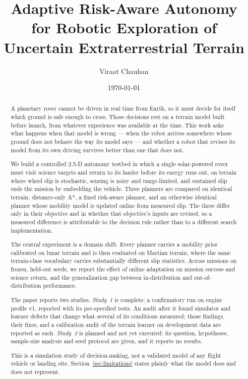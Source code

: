 \documentclass[11pt]{article}
\title{\textbf{Adaptive Risk-Aware Autonomy for Robotic Exploration of\\
Uncertain Extraterrestrial Terrain}}
\author{Viraat Chauhan}
\date{\today}
\begin{document}
\maketitle

\begin{abstract}
\noindent
A planetary rover cannot be driven in real time from Earth, so it must decide
for itself which ground is safe enough to cross. Those decisions rest on a
terrain model built before launch, from whatever experience was available at
the time. This work asks what happens when that model is wrong --- when the
robot arrives somewhere whose ground does not behave the way its model says
--- and whether a robot that revises its model from its own driving survives
better than one that does not.

We build a controlled 2.5-D autonomy testbed in which a single solar-powered
rover must visit science targets and return to its lander before its energy
runs out, on terrain where wheel slip is stochastic, sensing is noisy and
range-limited, and sustained slip ends the mission by embedding the vehicle.
Three planners are compared on identical terrain: distance-only \mbox{A*}, a
fixed risk-aware planner, and an otherwise identical planner whose mobility
model is updated online from measured slip. The three differ only in their
objective and in whether that objective's inputs are revised, so a measured
difference is attributable to the decision rule rather than to a different
search implementation.

The central experiment is a domain shift. Every planner carries a mobility
prior calibrated on lunar terrain and is then evaluated on Martian terrain,
where the same terrain-class vocabulary carries substantially different slip
statistics. Across \MainMissions{} missions on frozen, held-out seeds, we
report the effect of online adaptation on mission success and science return,
and the generalization gap between in-distribution and out-of-distribution
performance.

The paper reports two studies. \emph{Study~1} is complete: a confirmatory run
on engine profile v1, reported with its pre-specified tests. An audit after it
found simulator and learner defects that change what several of its conditions
measured; those findings, their fixes, and a calibration audit of the terrain
learner on development data are reported as such. \emph{Study~2} is planned and
not yet executed: its question, hypotheses, sample-size analysis and seed
protocol are given, and it reports no results.

This is a simulation study of decision-making, not a validated model of any
flight vehicle or landing site. Section~\ref{sec:limitations} states plainly
what the model does and does not represent.
\end{abstract}
\end{document}
